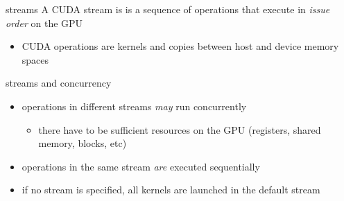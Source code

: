 \begin{frame}[fragile]{}
    \begin{info}{streams}
        A CUDA stream is is a sequence of operations that execute in \emph{issue order} on the GPU
        \begin{itemize}
            \item CUDA operations are kernels and copies between host and device memory spaces
        \end{itemize}
    \end{info}

    \begin{info}{streams and concurrency}
        \begin{itemize}
            \item operations in different streams \emph{may} run concurrently
            \begin{itemize}
                \item there have to be sufficient resources on the GPU (registers, shared memory, blocks, etc)
            \end{itemize}
            \item operations in the same stream \emph{are} executed sequentially
            \item if no stream is specified, all kernels are launched in the default stream
        \end{itemize}
    \end{info}

\end{frame}


